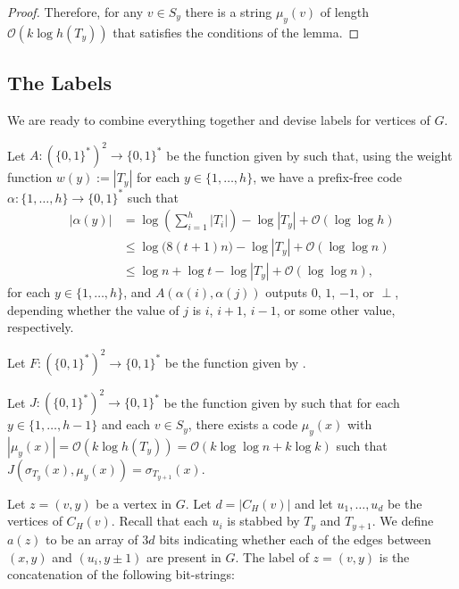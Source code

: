 \documentclass[kpfonts]{patmorin}
\newcommand{\snote}[1]{\fcolorbox{red}{yellow}{#1}}
\newcommand{\Oh}{\mathcal{O}}
\let\leq\leqslant
\begin{document}
\begin{proof}
  Therefore, for any $v\in S_y$ there is a string $\mu_y(v)$ of length $\Oh(k\log h(T_y))$ that satisfies the conditions of the lemma.
\end{proof}

\subsection{The Labels}

We are ready to combine everything together and devise labels for vertices of $G$.

Let $A:(\{0,1\}^{*})^2\to\{0,1\}^*$ be the function given by  such that, 
using the weight function $w(y):=|T_y|$ for each $y\in\{1,\ldots,h\}$,
we have a prefix-free code $\alpha:\{1,\ldots,h\}\to\{0,1\}^*$ such that
\begin{align*}
|\alpha(y)|&=\log\left(\textstyle\sum_{i=1}^h|T_i|\right) - \log|T_y| + \Oh(\log\log h)\\
&\leq \log\bigl( 8(t+1)n\bigr) - \log|T_y| + \Oh(\log\log n)\\
&\leq \log n + \log t -\log|T_y| + \Oh(\log\log n),
\end{align*}
for each $y\in\{1,\ldots,h\}$, and $A(\alpha(i),\alpha(j))$ outputs $0$, $1$, $-1$, or $\perp$, depending whether the value of $j$ is $i$, $i+1$, $i-1$, or some other value, respectively.


Let $F:(\{0,1\}^{*})^2\to\{0,1\}^*$ be the function given by .


Let $J:(\{0,1\}^{*})^2\to\{0,1\}^*$ be the function given by  such that
for each $y\in\{1,\ldots,h-1\}$ and each $v\in S_{y}$,
there exists a code $\mu_{y}(x)$ with $|\mu_{y}(x)|=\Oh(k\log h(T_{y}))=\Oh(k\log\log n+k \log k)$ such that $J(\sigma_{T_{y}}(x),\mu_{y}(x))=\sigma_{T_{y+1}}(x)$.


Let $z=(v,y)$ be a vertex in $G$.
Let $d = |C_{H}(v)|$ and let $u_1,\ldots,u_d$ be the vertices of $C_H(v)$. 
Recall that each $u_i$ is stabbed by $T_y$ and $T_{y+1}$.
We define $a(z)$ to be an array of $3d$ bits indicating whether 
each of the edges between $(x,y)$ and $(u_i,y\pm1)$ are present in $G$. 
The label of $z=(v,y)$ is the concatenation of the following bit-strings:
\end{document}

